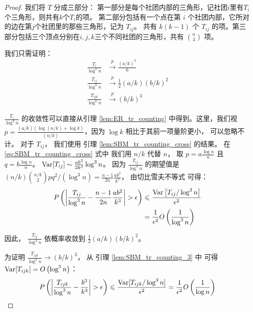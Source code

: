 \begin{proof}
 我们将 $T$ 分成三部分：
 第一部分是每个社团内部的三角形，记社团$i$里有$T_i$个三角形，则共有$k$个$T_i$的项。
 第二部分包括有一个点在第 $i$ 个社团内部，它所对的边在第$j$个社团里的那些三角形，记为 $T_{ij}$。
 共有 $k(k-1)$ 个 $T_{ij}$ 的项。第三部分包括三个顶点分别在$i,j,k$三个不同社团的三角形，共有
 $\binom{n}{3}$ 项。
	
	我们只需证明：
\begin{align}
	\frac{T_i}{\log ^3 n} &\xrightarrow{p} \frac{(a/k)^3}{6} \\
	\frac{T_{ij}}{\log^3 n}& \xrightarrow{p}\frac{1}{2}(a/k)(b/k)^2\\
	\frac{T_{ijk}}{\log^3 n} & \xrightarrow{p} (b/k)^3
	\end{align}
	
	$\frac{T_i}{\log ^3 n}$ 的收敛性可以直接从引理
 \ref{lem:ER_tr_counting} 中得到。这里，我们视$p=\frac{(a/k) (
    \log (n/k) + \log k)}{(n/k)}$，因为 $\log k$ 相比于其前一项量阶更小，
    可以忽略不计。
	对于 $T_{ij}$， 我们使用 
  引理 \ref{lem:SBM_tr_counting_cross}  的结果。
	在 \eqref{eq:SBM_tr_counting_cross} 式中
  我们用 $n/k$ 代替 $n$， 取 $p=a\frac{\log n}{n}$ 且 $q=b\frac{\log n}{n}$。
	$\operatorname{\mathrm{Var}}[T_{ij}] \sim \frac{ab^2}{2k^3} \log^3 n$。
  因为 $\frac{T_{ij}}{\log^3 n}$ 的期望值是
  $(n/k)\binom{n/k}{2}pq^2/(\log^3 n)
	=\frac{n-1}{2n}\frac{ab^2}{k^3}$， 由切比雪夫不等式
  可得：
	\begin{align*}
	P \left( \left|\frac{T_{ij}}{\log^3 n} - \frac{n-1}{2n}\frac{ab^2}{k^3} \right| > \epsilon
  \right) &\leqslant \frac{\operatorname{\mathrm{Var}}\left[T_{ij} / \log^3 n \right]}{\epsilon^2} \\
	& = \frac{1}{\epsilon^2}
	O \left( \frac{1}{\log^3 n} \right)
	\end{align*}
	
	因此， $\frac{T_{ij}}{\log^3 n} $ 依概率收敛到 $\frac{1}{2}(a/k)(b/k)^2$。
	
	为证明
  $\frac{T_{ijk}}{\log^3 n}\to (b/k)^3$，
  从 引理 \ref{lem:SBM_tr_counting_3} 中
  可得 $\operatorname{\mathrm{Var}}[T_{ijk}] = O\left(\log^5 n\right)$：
	$$
	P \left( \left|\frac{T_{ijk}}{\log^3 n} -\frac{b^3}{k^3} \right| > \epsilon
  \right) \leqslant \frac{\operatorname{\mathrm{Var}}[T_{ijk} / \log^3 n]}{\epsilon^2} = \frac{1}{\epsilon^2}
	O \left(\frac{1}{\log n} \right)
	$$
\end{proof}
